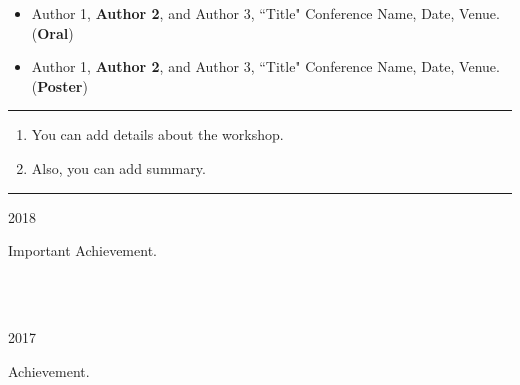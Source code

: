 \documentclass[11pt]{anirudhcv}
\begin{document}
\begin{itemize}
	\item Author 1, {\color{NextRed}\textbf{Author 2}}, and Author 3,  ``Title" Conference Name, Date, Venue. (\textbf{Oral})
\end{itemize}

\begin{itemize}
	\item Author 1, {\color{NextRed}\textbf{Author 2}}, and Author 3,  ``Title" Conference Name, Date, Venue. (\textbf{Poster})
\end{itemize}


\noindent\color{black}\rule{0.81\paperwidth}{0.5ex}
\newline
{}\hfill{}

\begin{enumerate}
	\item You can add details about the workshop.
	\item Also, you can add summary.
\end{enumerate}


\noindent\color{black}\rule{0.81\paperwidth}{0.5ex}
\newline
{}\hfill{}

\parbox[t]{0.175\textwidth}{2018~~{\color{red}\Large\FA{}}}\parbox[t]{0.825\textwidth}{{\large Important Achievement.}}\\\\

\parbox[t]{0.175\textwidth}{2017}\parbox[t]{0.825\textwidth}{{\large Achievement.}}\\\\

\end{document}
